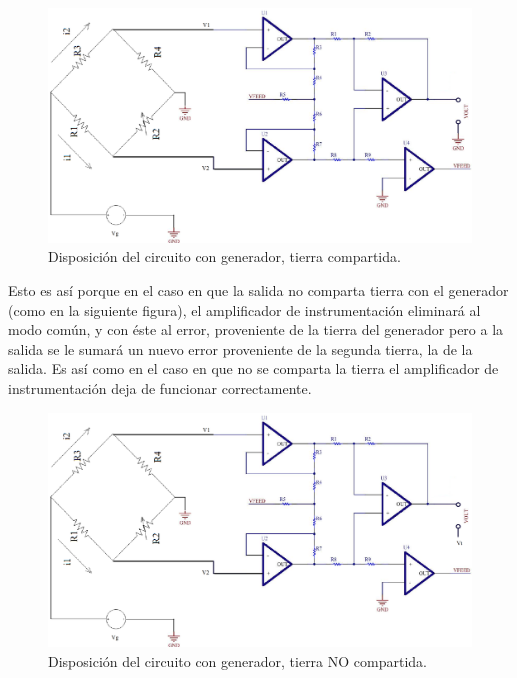 \documentclass[../../tc_tp3_main.tex]{subfiles}
\begin{document}
	\begin{figure}[H]	
		\centering
		\includegraphics[scale=0.3]{imagenes/tierra_amp.png}
		\caption{Disposición del circuito con generador, tierra compartida.}
		\label{fig:ej5_tierra_amp}
	\end{figure}

Esto es así porque en el caso en que la salida no comparta tierra con el generador (como en la siguiente figura), el amplificador de instrumentación eliminará al modo común, y con éste al error, proveniente de la tierra del generador pero a la salida se le sumará un nuevo error proveniente de la segunda tierra, la de la salida. Es así como en el caso en que no se comparta la tierra el amplificador de instrumentación deja de funcionar correctamente.\par

	\begin{figure}[H]	
		\centering
		\includegraphics[scale=0.3]{imagenes/no_tierra_amp.png}
		\caption{Disposición del circuito con generador, tierra NO compartida.}
		\label{fig:ej5_no_tierra_amp}
	\end{figure}
	
\end{document}
